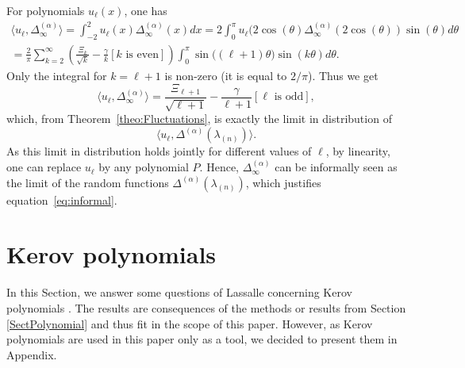 \documentclass[11pt]{amsart}
\theoremstyle{plain}
\theoremstyle{remark}
\begin{document}
For polynomials $u_\ell(x)$, one has
\begin{multline*}
    \langle u_\ell,\Delta_\infty^{(\alpha)} \rangle = \int_{-2}^2 u_\ell(x) \Delta_\infty^{(\alpha)}(x) dx
= 2 \int_0^\pi u_\ell(2 \cos(\theta)  \Delta_\infty^{(\alpha)}(2 \cos(\theta)) \sin(\theta) d\theta\\
=\frac{2}{\pi} \sum_{k=2}^\infty \left(\frac{\Xi_k}{\sqrt{k}}-\frac{\gamma}{k} [k\text{ is even}]\right)
\int_0^\pi \sin\big( (\ell+1)\theta \big) \sin(k \theta) d\theta.
\end{multline*}
Only the integral for $k=\ell+1$ is non-zero (it is equal to $2/\pi$). Thus we get
\[\langle u_\ell,\Delta_\infty^{(\alpha)} \rangle =
\frac{\Xi_{\ell+1}}{\sqrt{\ell+1}}-\frac{\gamma}{\ell+1} [\ell\text{ is odd}],\]
which, from Theorem~\ref{theo:Fluctuations}, is exactly the limit in distribution of 
\[ \langle u_\ell,\Delta^{(\alpha)}(\lambda_{(n)}) \rangle.\]
As this limit in distribution holds jointly for different values of $\ell$,
by linearity, one can replace $u_\ell$ by any polynomial $P$.
Hence, $\Delta_\infty^{(\alpha)}$ can be informally seen as the limit
of the random functions $\Delta^{(\alpha)}(\lambda_{(n)})$,
which justifies equation~\eqref{eq:informal}.

\appendix

\section{Kerov polynomials}
\label{app:Kerov_polynomials}

In this Section, we answer some questions of Lassalle 
concerning Kerov polynomials \cite{Lassalle2009}.
The results are consequences of the methods or results from Section \ref{SectPolynomial}
and thus fit in the scope of this paper.
However, as Kerov polynomials are 
used in this paper only as a tool, 
we decided to present them in Appendix.
\end{document}
